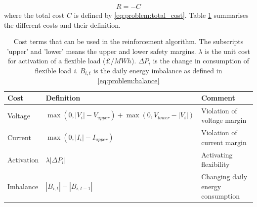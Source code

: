 \documentclass[class=book, crop=false]{standalone}
\begin{document}
\begin{equation}
   \begin{aligned}
   \label{eq:problem:total_reward}
    R = - C
    \end{aligned} 
\end{equation}
where the total cost $C$ is defined by \eqref{eq:problem:total_cost}. Table \ref{table:reward_terms} summarises the different costs and their definition. 

\begin{table}[ht]
\centering
\caption{Cost terms that can be used in the reinforcement algorithm. The subscripts 'upper' and 'lower' means the upper and lower safety margins. $\lambda$ is the unit cost for activation of a flexible load ($\pounds/MWh$). $\Delta P_{i}$ is the change in consumption of flexible load \textit{i}. $B_{i,t}$ is the daily energy imbalance as defined in \eqref{eq:problem:balance}}
\label{table:reward_terms}
\begin{tabular}{l|ll}

Cost  & Definition & Comment
\\ 
\hline
Voltage &
$\max(0,|V_{i}| - V_{upper}) + \max(0,V_{lower}- |V_{i}|)$ &
Violation of voltage margin
\\
Current &
$\max(0,|I_{i}| - I_{upper})$&
Violation of current margin
\\
Activation &
$\lambda |\Delta P_{i}|$&
Activating flexibility
\\
Imbalance &
$|B_{i,t}|- |B_{i,t-1}|$&
Changing daily energy consumption
\\
\hline
\end{tabular}
\end{table}
\end{document}
